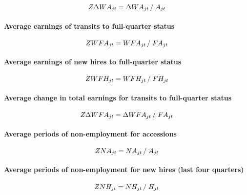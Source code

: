 \begin{equation}
Z\Delta WA_{jt} = {\Delta WA_{jt} } \left/ {\vphantom {{\Delta WA_{jt} }
{A_{jt} }}} \right. {A_{jt} }
\end{equation}

\paragraph{Average earnings of transits to full-quarter status}

\begin{equation}
ZWFA_{jt}={WFA_{jt}}\left/ {\vphantom {{WFA_{jt} } {FA_{jt} }}}\right. {%
FA_{jt}}
\end{equation}

\paragraph{Average earnings of new hires to full-quarter status}

\begin{equation}
ZWFH_{jt}={WFH_{jt}}\left/ {\vphantom {{WFA_{jt} } {FA_{jt} }}}\right. {%
FH_{jt}}
\end{equation}

\paragraph{Average change in total earnings for transits to full-quarter
status}

\begin{equation}
Z\Delta WFA_{jt} = {\Delta WFA_{jt} } \left/ {\vphantom {{\Delta WFA_{jt} }
{FA_{jt} }}} \right. {FA_{jt} }
\end{equation}

\paragraph{Average periods of non-employment for accessions}

\begin{equation}
ZNA_{jt} = {NA_{jt} } \left/ {\vphantom {{NA_{jt} } {A_{jt} }}} \right. {%
A_{jt} }
\end{equation}

\paragraph{Average periods of non-employment for new hires (last four
quarters)}

\begin{equation}
ZNH_{jt} = {NH_{jt} } \left/ {\vphantom {{NH_{jt} } {H_{jt} }}} \right. {%
H_{jt} }
\end{equation}

